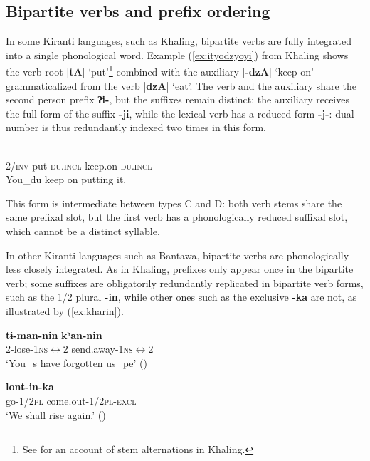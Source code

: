 \documentclass[11pt]{article}
\newcommand{\ipa}[1]{{\phon\textbf{#1}}}
\newcommand{\dhatu}[2]{|\ipa{#1}| `#2'}
\newcommand{\refb}[1]{(\ref{#1})}
\begin{document}
\subsection{Bipartite verbs and prefix ordering}
In some Kiranti languages, such as Khaling, bipartite verbs are fully integrated into a single phonological word.  Example (\ref{ex:ityodzyoyi}) from Khaling shows the verb root \dhatu{tA}{put}\footnote{See \citet{jacques12khaling} for an account of stem alternations in Khaling.} combined with the auxiliary \dhatu{-dzA}{keep on} grammaticalized from the verb \dhatu{dzA}{eat}. The verb and the auxiliary share the second person prefix \ipa{ʔi-}, but the suffixes remain distinct: the auxiliary receives the full form of the suffix \ipa{-ji}, while the lexical verb has a reduced form \ipa{-j-}: dual number is thus redundantly indexed two times in this form.

\begin{exe}
\ex \label{ex:ityodzyoyi}
\gll \ipa{ʔi-tɵ-j-dzɵ-ji}\\
2/\textsc{inv}-put-\textsc{du.incl}-keep.on-\textsc{du.incl} \\
\glt You_{du} keep on putting it.
\end{exe}

This form is intermediate between types C and D: both verb stems share the same prefixal slot, but the first verb has a phonologically reduced suffixal slot, which cannot be a distinct syllable.

In other Kiranti languages such as Bantawa, bipartite verbs are phonologically less closely integrated. As in Khaling, prefixes only appear once in the bipartite verb; some suffixes are obligatorily redundantly replicated in bipartite verb forms, such as the 1/2 plural \ipa{-in}, while other ones such as the exclusive \ipa{-ka} are not, as illustrated by \refb{ex:kharin}. 

\begin{exe}
\ex \label{ex:timannin}
\gll
\ipa{tɨ-man-nin} \ipa{kʰan-nin} \\
2-lose-\textsc{1ns$\leftrightarrow$2} send.away-\textsc{1ns$\leftrightarrow$2} \\
\glt ‘You_s have forgotten us_{pe}’ (\citealt[168]{doornenbal09})
\end{exe}

 \begin{exe}
\ex  \label{ex:kharin}
\gll \ipa{kʰar-in} \ipa{lont-in-ka} \\
go-\textsc{1/2pl} come.out-\textsc{1/2pl-excl} \\
\glt `We shall rise again.' (\citealt[254]{doornenbal09})
\end{exe}
\end{document}

